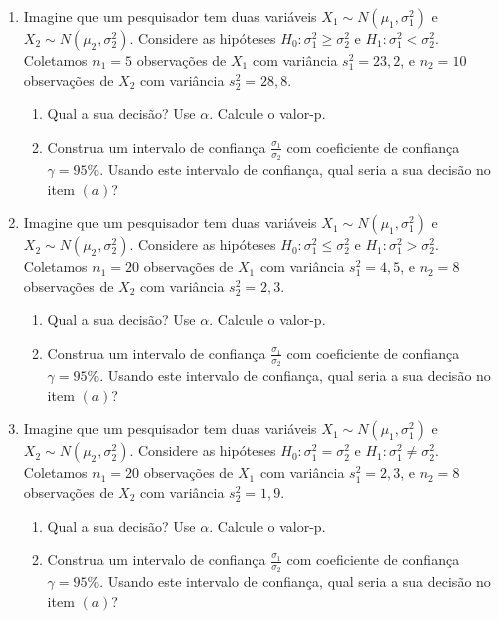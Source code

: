 \documentclass[8pt, a4paper]{article}
\begin{document}
\begin{enumerate}
	\item Imagine que um pesquisador tem duas variáveis $X_1 \sim N(\mu_1, \sigma_1^2)$ e $X_2 \sim N(\mu_2, \sigma_2^2)$. Considere as hipóteses $H_0: \sigma_1^2 \geq \sigma_2^2$ e $H_1: \sigma_1^2 < \sigma_2^2$. Coletamos $n_1=5$ observações de $X_1$ com variância $s_1^2 = 23,2$, e $n_2=10$ observações de $X_2$ com variância $s_2^2 = 28,8$. 
	\begin{enumerate}
		\item Qual a sua decisão? Use $\alpha$. Calcule o valor-p. 
		\item Construa um intervalo de confiança $\frac{\sigma_1}{\sigma_2}$ com coeficiente de confiança $\gamma=95\%$. Usando este intervalo de confiança, qual seria a sua decisão no item $(a)$?
	\end{enumerate}
	
	\item Imagine que um pesquisador tem duas variáveis $X_1 \sim N(\mu_1, \sigma_1^2)$ e $X_2 \sim N(\mu_2, \sigma_2^2)$. Considere as hipóteses $H_0: \sigma_1^2 \leq \sigma_2^2$ e $H_1: \sigma_1^2 > \sigma_2^2$. Coletamos $n_1=20$ observações de $X_1$ com variância $s_1^2 = 4,5$, e $n_2=8$ observações de $X_2$ com variância $s_2^2 = 2,3$. 
	\begin{enumerate}
		\item Qual a sua decisão? Use $\alpha$. Calcule o valor-p. 
		\item Construa um intervalo de confiança $\frac{\sigma_1}{\sigma_2}$ com coeficiente de confiança $\gamma=95\%$. Usando este intervalo de confiança, qual seria a sua decisão no item $(a)$?
	\end{enumerate}

	\item Imagine que um pesquisador tem duas variáveis $X_1 \sim N(\mu_1, \sigma_1^2)$ e $X_2 \sim N(\mu_2, \sigma_2^2)$. Considere as hipóteses $H_0: \sigma_1^2 = \sigma_2^2$ e $H_1: \sigma_1^2 \neq \sigma_2^2$. Coletamos $n_1=20$ observações de $X_1$ com variância $s_1^2 = 2,3$, e $n_2=8$ observações de $X_2$ com variância $s_2^2 = 1,9$. 
	\begin{enumerate}
		\item Qual a sua decisão? Use $\alpha$. Calcule o valor-p. 
		\item Construa um intervalo de confiança $\frac{\sigma_1}{\sigma_2}$ com coeficiente de confiança $\gamma=95\%$. Usando este intervalo de confiança, qual seria a sua decisão no item $(a)$?
	\end{enumerate}


\end{enumerate}
\end{document}

